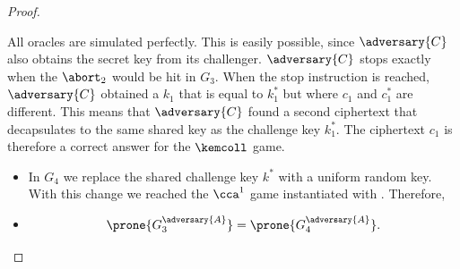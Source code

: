 \begin{proof}
\begin{itemize}
                                                                                            All oracles are simulated perfectly.
                                                                                            This is easily possible, since $\adversary{C}$ also obtains the secret key from its challenger.
                                                                                            $\adversary{C}$ stops exactly when the $\abort_2$ would be hit in $G_3$.
                                                                                            When the stop instruction is reached, $\adversary{C}$ obtained a $k_1$ that is equal to $k^*_1$ but where $c_1$ and $c^*_1$ are different.
                                                                                            This means that $\adversary{C}$ found a second ciphertext that decapsulates to the same shared key as the challenge key $k^*_1$.
                                                                                            The ciphertext $c_1$ is therefore a correct answer for the $\kemcoll$ game.
                                                                                        \end{itemize}

                                                                                        \begin{itemize}
                                                                                        \item[\textbf{Game 4}]
                                                                                            In $G_4$ we replace the shared challenge key $k^*$ with a uniform random key.
                                                                                            With this change we reached the $\cca^1$ game instantiated with \hqb.
                                                                                            Therefore,

                                                                                        \item[\emph{Claim 4}]

                                                                                            \[ \prone{G^{\adversary{A}}_3} = \prone{G^{\adversary{A}}_4}. \]


\end{itemize}
\end{proof}
